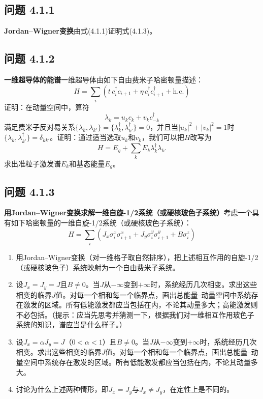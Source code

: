
\subsection*{问题 4.1.1}

\textbf{Jordan--Wigner变换}\quad 由式(4.1.1)证明式(4.1.3)。

\subsection*{问题 4.1.2}

\textbf{一维超导体的能谱}\quad 一维超导体由如下自由费米子哈密顿量描述：
\begin{equation*}
H=\sum_{i}(t\,c_{i}^{\dagger}c_{i+1}+\eta\,c_{i}^{\dagger}c_{i+1}^{\dagger}+\text{h.c.})\tag{4.1.6}
\end{equation*}
证明：在动量空间中，算符
\begin{equation*}
\lambda_{k}=u_{k}c_{k}+v_{k}c_{-k}^{\dagger}
\end{equation*}
满足费米子反对易关系$\{\lambda_{k},\lambda_{k'}\}=\{\lambda_{k}^{\dagger},\lambda_{k'}^{\dagger}\}=0$，并且当$|u_{k}|^{2}+|v_{k}|^{2}=1$时$\{\lambda_{k},\lambda_{k'}^{\dagger}\}=\delta_{kk'}$。证明：通过适当选取$u_{k}$和$v_{k}$，我们可以把$H$改写为
\begin{equation*}
H=E_{g}+\sum_{k}E_{k}\lambda_{k}^{\dagger}\lambda_{k}.
\end{equation*}
求出准粒子激发谱$E_{k}$和基态能量$E_{g}$。

\subsection*{问题 4.1.3}

\textbf{用Jordan--Wigner变换求解一维自旋-1/2系统（或硬核玻色子系统）}\quad 考虑一个具有如下哈密顿量的一维自旋-1/2系统（或硬核玻色子系统）：
\begin{equation*}
H=\sum_{i}\left(J_{x}\sigma_{i}^{x}\sigma_{i+1}^{x}+J_{y}\sigma_{i}^{y}\sigma_{i+1}^{y}+B\sigma_{i}^{z}\right)
\end{equation*}
\begin{enumerate}
\item 用Jordan--Wigner变换（对一维格子取自然排序），把上述相互作用的自旋-1/2（或硬核玻色子）系统映射为一个自由费米子系统。
\item 设$J_x=J_y=J$且$B\neq 0$。当$J$从$-\infty$变到$+\infty$时，系统经历几次相变。求出这些相变的临界$J$值。对每一个相和每一个临界点，画出总能量--动量空间中系统存在激发的区域。所有低能激发都应当包括在内，不论其动量多大；高能激发则不必包括。（提示：应当先思考并猜测一下，根据我们对一维相互作用玻色子系统的知识，谱应当是什么样子。）
\item 设$J_x=\alpha J_y=J$（$0<\alpha<1$）且$B\neq 0$。当$J$从$-\infty$变到$+\infty$时，系统经历几次相变。求出这些相变的临界$J$值。对每一个相和每一个临界点，画出总能量--动量空间中系统存在激发的区域。所有低能激发都应当包括在内，不论其动量多大。
\item 讨论为什么上述两种情形，即$J_x=J_y$与$J_x\neq J_y$，在定性上是不同的。
\end{enumerate}

